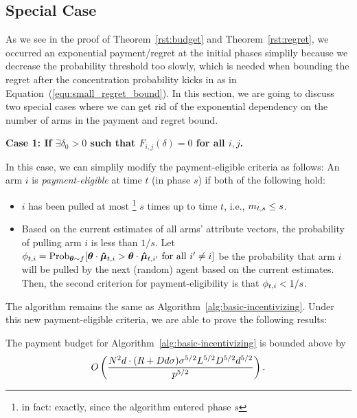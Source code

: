 \subsection{Special Case}

As we see in the proof of Theorem~\ref{rst:budget} and Theorem~\ref{rst:regret}, we occurred an exponential payment/regret at the initial phases simplily because we decrease the probability threshold too slowly, which is needed when bounding the regret after the concentration probability kicks in as in Equation~(\ref{equ:small_regret_bound}). In this section, we are going to discuss two special cases where we can get rid of the exponential dependency on the number of arms in the payment and regret bound. 

\textbf{Case 1: If $\exists \delta_0>0$ such that $F_{i,j}(\delta)=0$ for all $i,j$.}

In this case, we can simplily modify the payment-eligible criteria as follows: An arm $i$ is \emph{payment-eligible} at time $t$ (in phase $s$)
if both of the following hold:

\begin{itemize}
\item $i$ has been pulled at most%
\footnote{in fact: exactly, since the algorithm entered phase $s$}
$s$ times up to time $t$, i.e., $m_{t,s} \leq s$.
\item Based on the current estimates  of all arms'
attribute vectors, the probability of pulling arm $i$ is less than $1/s$. Let $\PullProb{t}{i} = \Prob[\AgV \sim \AgentDist]{\AgV \cdot \ArmEV{t}{i} > \AgV
  \cdot \ArmEV{t}{i'} \mbox{ for all } i' \neq i}$
be the probability that arm $i$ will be pulled
by the next (random) agent based on the current estimates. 
Then, the second criterion for payment-eligibility is that
$\phi_{t,i} < 1/s$.
\end{itemize}

The algorithm remains the same as Algorithm~\ref{alg:basic-incentivizing}. Under this new payment-eligible criteria, we are able to prove the following results:

\begin{theorem}
The payment budget for Algorithm~\ref{alg:basic-incentivizing} is bounded above by 
\begin{align*}
O \left(\frac{N^2 d \cdot (R + D d \sigma)\sigma^{5/2}L^{5/2}D^{5/2}d^{5/2}}{p^{5/2}} \right). 
\end{align*}
\end{theorem}

